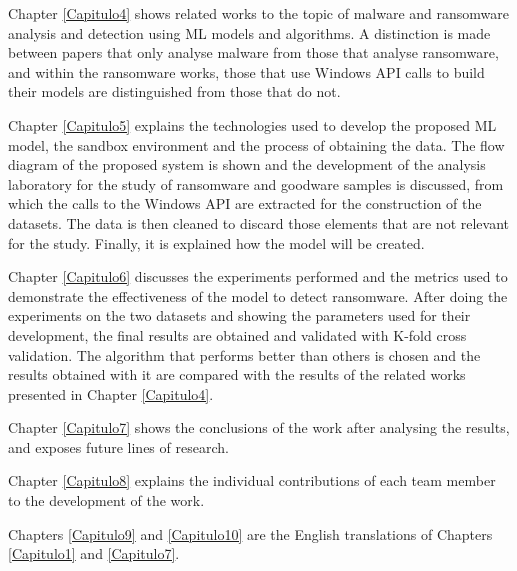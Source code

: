 Chapter \ref{Capitulo4} shows related works to the topic of malware and ransomware analysis and detection using \gls{ML} models and algorithms. A distinction is made between papers that only analyse malware from those that analyse ransomware, and within the ransomware works, those that use Windows \gls{API} calls to build their models are distinguished from those that do not.

Chapter \ref{Capitulo5} explains the technologies used to develop the proposed \gls{ML} model, the sandbox environment and the process of obtaining the data. The flow diagram of the proposed system is shown and the development of the analysis laboratory for the study of ransomware and goodware samples is discussed, from which the calls to the Windows \gls{API} are extracted for the construction of the datasets. The data is then cleaned to discard those elements that are not relevant for the study. Finally, it is explained how the model will be created.

Chapter \ref{Capitulo6} discusses the experiments performed and the metrics used to demonstrate the effectiveness of the model to detect ransomware. After doing the experiments on the two datasets and showing the parameters used for their development, the final results are obtained and validated with K-fold cross validation. The algorithm that performs better than others is chosen and the results obtained with it are compared with the results of the related works presented in Chapter \ref{Capitulo4}.

Chapter \ref{Capitulo7} shows the conclusions of the work after analysing the results, and exposes future lines of research.

Chapter \ref{Capitulo8} explains the individual contributions of each team member to the development of the work.

Chapters \ref{Capitulo9} and \ref{Capitulo10} are the English translations of Chapters \ref{Capitulo1} and \ref{Capitulo7}.